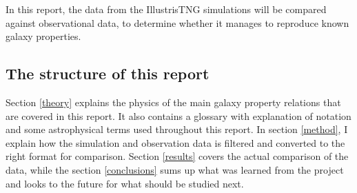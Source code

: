 In this report, the data from the IllustrisTNG simulations will be compared against observational data, to determine whether it manages to reproduce known galaxy properties.


\subsection{The structure of this report}
Section \ref{theory} explains the physics of the main galaxy property relations that are covered in this report. It also contains a glossary with explanation of notation and some astrophysical terms used throughout this report. In section \ref{method}, I explain how the simulation and observation data is filtered and converted to the right format for comparison. Section \ref{results} covers the actual comparison of the data, while the section \ref{conclusions} sums up what was learned from the project and looks to the future for what should be studied next.